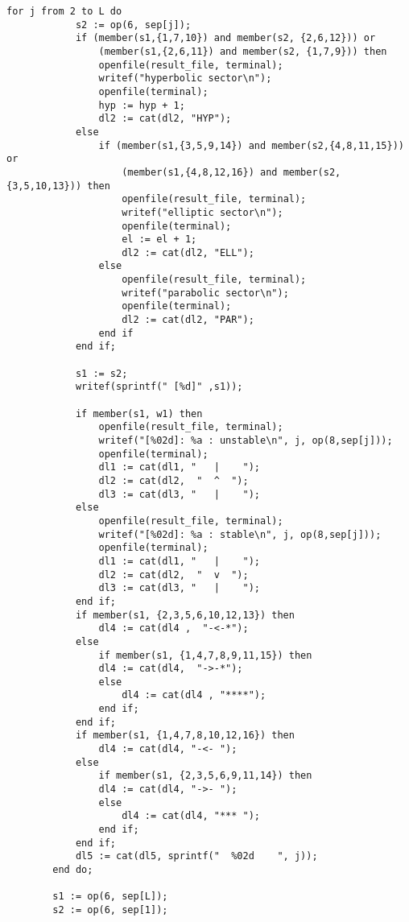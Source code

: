 \documentclass[a4paper,10pt]{article}
\begin{document}
\begin{lstlisting}[name=blowup]
        for j from 2 to L do
            s2 := op(6, sep[j]);
            if (member(s1,{1,7,10}) and member(s2, {2,6,12})) or
                (member(s1,{2,6,11}) and member(s2, {1,7,9})) then
                openfile(result_file, terminal);
                writef("hyperbolic sector\n");
                openfile(terminal);
                hyp := hyp + 1;
                dl2 := cat(dl2, "HYP");
            else
                if (member(s1,{3,5,9,14}) and member(s2,{4,8,11,15})) or
                    (member(s1,{4,8,12,16}) and member(s2,{3,5,10,13})) then
                    openfile(result_file, terminal);
                    writef("elliptic sector\n");
                    openfile(terminal);
                    el := el + 1;
                    dl2 := cat(dl2, "ELL");
                else
                    openfile(result_file, terminal);
                    writef("parabolic sector\n");
                    openfile(terminal);
                    dl2 := cat(dl2, "PAR");
                end if
            end if;

            s1 := s2;
            writef(sprintf(" [%d]" ,s1));

            if member(s1, w1) then
                openfile(result_file, terminal);
                writef("[%02d]: %a : unstable\n", j, op(8,sep[j]));
                openfile(terminal);
                dl1 := cat(dl1, "   |    ");
                dl2 := cat(dl2,  "  ^  ");
                dl3 := cat(dl3, "   |    ");
            else
                openfile(result_file, terminal);
                writef("[%02d]: %a : stable\n", j, op(8,sep[j]));
                openfile(terminal);
                dl1 := cat(dl1, "   |    ");
                dl2 := cat(dl2,  "  v  ");
                dl3 := cat(dl3, "   |    ");
            end if;
            if member(s1, {2,3,5,6,10,12,13}) then
                dl4 := cat(dl4 ,  "-<-*");
            else
                if member(s1, {1,4,7,8,9,11,15}) then
                dl4 := cat(dl4,  "->-*");
                else
                    dl4 := cat(dl4 , "****");
                end if;
            end if;
            if member(s1, {1,4,7,8,10,12,16}) then
                dl4 := cat(dl4, "-<- ");
            else
                if member(s1, {2,3,5,6,9,11,14}) then
                dl4 := cat(dl4, "->- ");
                else
                    dl4 := cat(dl4, "*** ");
                end if;
            end if;
            dl5 := cat(dl5, sprintf("  %02d    ", j));
        end do;

        s1 := op(6, sep[L]);
        s2 := op(6, sep[1]);


\end{lstlisting}
\end{document}
